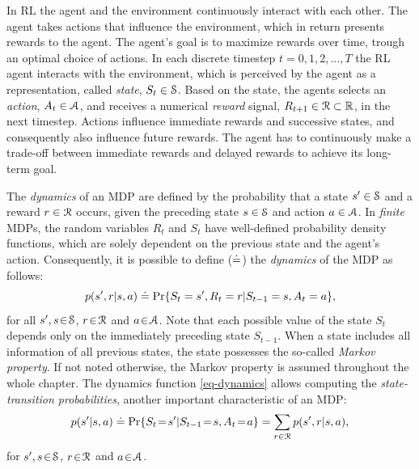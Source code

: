 \documentclass[a4paper, 12pt]{article}
\begin{document}
In RL the agent and the environment continuously interact with each other. The
agent takes actions that influence the environment, which in return presents
rewards to the agent. The agent's goal is to maximize rewards over time, trough
an optimal choice of actions. In each discrete timestep \(t\!=\!0,1,2,...,T\) the
RL agent interacts with the environment, which is perceived by the agent as a
representation, called \emph{state}, \(S_t \in \S\). Based on the state, the agents
selects an \emph{action}, \(A_t\in\A\), and receives a numerical \emph{reward} signal,
\(R_{t+1}\in\R\subset\Re\), in the next timestep. Actions influence immediate
rewards and successive states, and consequently also influence future rewards.
The agent has to continuously make a trade-off between immediate rewards and
delayed rewards to achieve its long-term goal.

The \emph{dynamics} of an MDP are defined by the probability that a state \(s'\in \S\)
and a reward \(r\in\R\) occurs, given the preceding state \(s\in\S\) and action
\(a\in\A\). In \emph{finite} MDPs, the random variables \(R_t\) and \(S_t\) have
well-defined probability density functions, which are solely dependent on the
previous state and the agent's action. Consequently, it is possible to define
(\(\defeq\)) the \emph{dynamics} of the MDP as follows:
\begin{equation} \label{eq-dynamics}
    p(s',r|s,a) \defeq \Pr{S_t=s',R_t=r|S_{t-1}=s,A_t=a},
\end{equation}
for all \(s',s\!\in\!\S\), \(r\!\in\!\R\) and \(a\!\in\!\A\). Note that each possible
value of the state \(S_t\) depends only on the immediately preceding state
\(S_{t-1}\). When a state includes all information of all previous states, the
state possesses the so-called \emph{Markov property}. If not noted otherwise, the
Markov property is assumed throughout the whole chapter. The dynamics function
\eqref{eq-dynamics} allows computing the \emph{state-transition probabilities},
another important characteristic of an MDP:
\begin{equation}
    p(s'|s,a) \defeq \Pr{S_t\!=\!s'|S_{t-1}\!=\!s,A_t\!=\!a} = \sum_{r\in\R}{p(s', r|s, a)},
\end{equation}
for \(s',s\!\in\!\S\), \(r\!\in\!\R\) and \(a\!\in\!\A\).
\end{document}
